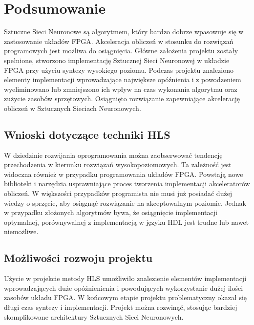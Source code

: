 \newpage %
\cleardoublepage %
\pagestyle{headings}

\section{Podsumowanie}

Sztuczne Sieci Neuronowe są algorytmem, który bardzo dobrze wpasowuje się w zastosowanie układów FPGA. Akceleracja obliczeń w stosunku do rozwiązań programowych jest możliwa do osiągnięcia. Główne założenia projektu zostały spełnione, stworzono implementację Sztucznej Sieci Neuronowej w układzie FPGA przy użyciu syntezy wysokiego poziomu. Podczas projektu znaleziono elementy implementacji wprowadzające największe opóźnienia i z powodzeniem wyeliminowano lub zmniejszono ich wpływ na czas wykonania algorytmu oraz zużycie zasobów sprzętowych. Osiągnięto rozwiązanie zapewniające akcelerację obliczeń w Sztucznych Sieciach Neuronowych.

\subsection{Wnioski dotyczące techniki HLS}
W dziedzinie rozwijania oprogramowania można zaobserwować tendencję przechodzenia w kierunku rozwiązań wysokopoziomowych.
Ta zależność jest widoczna również w przypadku programowania układów FPGA. Powstają nowe biblioteki i narzędzia usprawniające proces tworzenia implementacji akceleratorów obliczeń. W większości przypadków programista nie musi już posiadać dużej wiedzy o sprzęcie, aby osiągnąć rozwiązanie na akceptowalnym poziomie. Jednak w przypadku złożonych algorytmów bywa, że osiągnięcie implementacji optymalnej, porównywalnej z implementacją w języku HDL jest trudne lub nawet niemożliwe.

\subsection{Możliwości rozwoju projektu}

Użycie w projekcie metody HLS umożliwiło znalezienie elementów implementacji wprowadzających duże opóźnienienia i powodujących wykorzystanie dużej ilości zasobów układu FPGA. W końcowym etapie projektu problematyczny okazał się długi czas syntezy i implementacji. Projekt można rozwinąć, stosując bardziej skomplikowane architektury Sztucznych Sieci Neuronowych.

